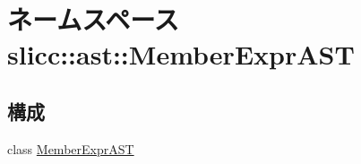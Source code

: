 \hypertarget{namespaceslicc_1_1ast_1_1MemberExprAST}{
\section{ネームスペース slicc::ast::MemberExprAST}
\label{namespaceslicc_1_1ast_1_1MemberExprAST}
}
\subsection*{構成}
\begin{DoxyCompactItemize}
\item 
class \hyperlink{classslicc_1_1ast_1_1MemberExprAST_1_1MemberExprAST}{MemberExprAST}
\end{DoxyCompactItemize}
